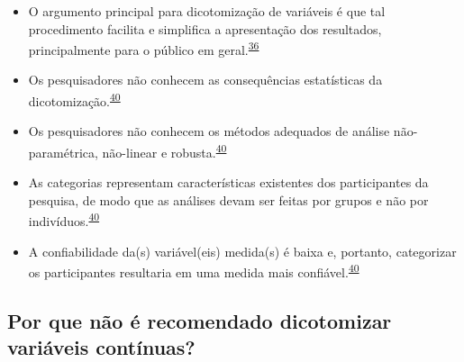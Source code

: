 \documentclass[
]{book}
\begin{document}
\begin{itemize}
\item
  O argumento principal para dicotomização de variáveis é que tal procedimento facilita e simplifica a apresentação dos resultados, principalmente para o público em geral.\textsuperscript{\protect\hyperlink{ref-Fedorov2009}{36}}
\item
  Os pesquisadores não conhecem as consequências estatísticas da dicotomização.\textsuperscript{\protect\hyperlink{ref-MacCallum2002}{40}}
\item
  Os pesquisadores não conhecem os métodos adequados de análise não-paramétrica, não-linear e robusta.\textsuperscript{\protect\hyperlink{ref-MacCallum2002}{40}}
\item
  As categorias representam características existentes dos participantes da pesquisa, de modo que as análises devam ser feitas por grupos e não por indivíduos.\textsuperscript{\protect\hyperlink{ref-MacCallum2002}{40}}
\item
  A confiabilidade da(s) variável(eis) medida(s) é baixa e, portanto, categorizar os participantes resultaria em uma medida mais confiável.\textsuperscript{\protect\hyperlink{ref-MacCallum2002}{40}}
\end{itemize}

\hypertarget{por-que-nuxe3o-uxe9-recomendado-dicotomizar-variuxe1veis-contuxednuas}{%
\subsection{Por que não é recomendado dicotomizar variáveis contínuas?}\label{por-que-nuxe3o-uxe9-recomendado-dicotomizar-variuxe1veis-contuxednuas}}
\end{document}
